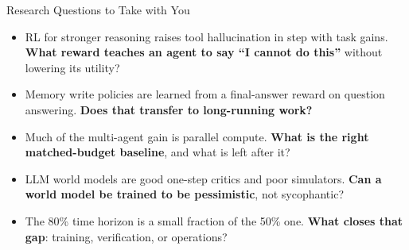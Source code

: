 \begin{frame}{Research Questions to Take with You}
    \begin{itemize}\itemsep0.35em
        \item RL for stronger reasoning raises tool hallucination in step with task gains. \textbf{What reward teaches an agent to say ``I cannot do this''} without lowering its utility?
        \item Memory write policies are learned from a final-answer reward on question answering. \textbf{Does that transfer to long-running work?}
        \item Much of the multi-agent gain is parallel compute. \textbf{What is the right matched-budget baseline}, and what is left after it?
        \item LLM world models are good one-step critics and poor simulators. \textbf{Can a world model be trained to be pessimistic}, not sycophantic?
        \item The 80\% time horizon is a small fraction of the 50\% one. \textbf{What closes that gap}: training, verification, or operations?
    \end{itemize}
\end{frame}
